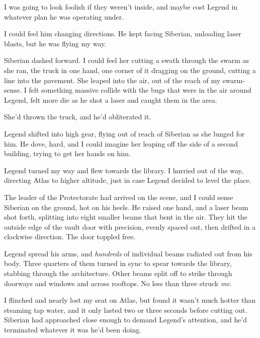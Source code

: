 I was going to look foolish if they weren't inside, and maybe cost Legend in whatever plan he was operating under.



I could feel him changing directions.  He kept facing Siberian, unloading laser blasts, but he was flying my way.



Siberian dashed forward.  I could feel her cutting a swath through the swarm as she ran, the truck in one hand, one corner of it dragging on the ground, cutting a line into the pavement.  She leaped into the air, out of the reach of my swarm-sense.  I felt something massive collide with the bugs that were in the air around Legend, felt more die as he shot a laser and caught them in the area.



She'd thrown the truck, and he'd obliterated it.



Legend shifted into high gear, flying out of reach of Siberian as she lunged for him.  He dove, hard, and I could imagine her leaping off the side of a second building, trying to get her hands on him.



Legend turned my way and flew towards the library.  I hurried out of the way, directing Atlas to higher altitude, just in case Legend decided to level the place.



The leader of the Protectorate had arrived on the scene, and I could sense Siberian on the ground, hot on his heels.  He raised one hand, and a laser beam shot forth, splitting into eight smaller beams that bent in the air.  They hit the outside edge of the vault door with precision, evenly spaced out, then drifted in a clockwise direction.  The door toppled free.



Legend spread his arms, and \emph{hundreds} of individual beams radiated out from his body.  Three quarters of them turned in sync to spear towards the library, stabbing through the architecture.  Other beams split off to strike through doorways and windows and across rooftops.  No less than three struck \emph{me}.



I flinched and nearly lost my seat on Atlas, but found it wasn't much hotter than steaming tap water, and it only lasted two or three seconds before cutting out.  Siberian had approached close enough to demand Legend's attention, and he'd terminated whatever it was he'd been doing.



